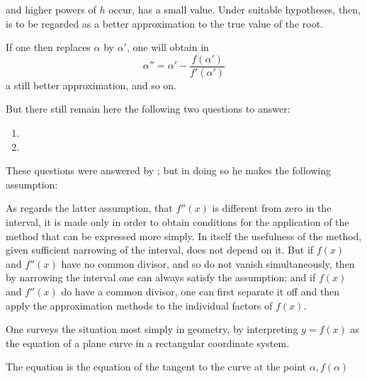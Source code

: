 and higher powers of $h$ occur, has a small value. Under suitable
hypotheses, then,
is to be regarded as a better approximation to the true value of the
root.

If one then replaces $\alpha$ by $\alpha'$, one will obtain in
\[ \alpha'' = \alpha' - \frac{f(\alpha')}{f'(\alpha')} \]
a still better approximation, and so on.

But there still remain here the following two questions to answer:
\begin{enumerate}
\item[1.] 
\item[2.] 
\end{enumerate}
These questions were answered by ; but in doing so he
makes the following assumption:



As regards the latter assumption, that $f''(x)$ is different from zero
in the interval, it is made only in order to obtain conditions for the
application of the method that can be expressed more simply. In itself
the usefulness of the method, given sufficient narrowing of the
interval, does not depend on it. But if $f(x)$ and $f''(x)$ have no
common divisor, and so do not vanish simultaneously, then by narrowing
the interval one can always satisfy the  assumption;
and if $f(x)$ and $f''(x)$ do have a common divisor, one can first
separate it off and then apply the approximation methods to the
individual factors of $f(x)$.

One surveys the situation most simply in geometry, by interpreting
$y=f(x)$ as the equation of a plane curve in a rectangular coordinate
system.

The equation
is the equation of the tangent to the curve at the point $\alpha, f(\alpha)$
